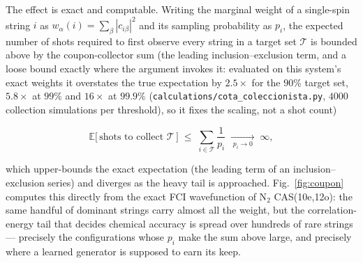\documentclass[onecolumn,a4paper]{quantumarticle}
\begin{document}
The effect is exact and computable. Writing the marginal weight of a single-spin string $i$ as $w_\alpha(i)=\sum_\beta|c_{i\beta}|^2$ and its sampling probability as $p_i$, the expected number of shots required to first observe every string in a target set $\mathcal T$ is bounded above by the coupon-collector sum (the leading inclusion--exclusion term, and a loose bound exactly where the argument invokes it: evaluated on this system's exact weights it overstates the true expectation by $2.5\times$ for the $90\%$ target set, $5.8\times$ at $99\%$ and $16\times$ at $99.9\%$ (\texttt{calculations/cota\_coleccionista.py}, $4000$ collection simulations per threshold), so it fixes the scaling, not a shot count)

\begin{equation}
\mathbb E\big[\,\text{shots to collect } \mathcal T\,\big] \;\le\; \sum_{i\in\mathcal T}\frac{1}{p_i} \;\xrightarrow[\;p_i\to 0\;]{}\; \infty,
\end{equation}

which upper-bounds the exact expectation (the leading term of an inclusion--exclusion series) and diverges as the heavy tail is approached. Fig.~\ref{fig:coupon} computes this directly from the exact FCI wavefunction of N$_2$ CAS(10e,12o): the same handful of dominant strings carry almost all the weight, but the correlation-energy tail that decides chemical accuracy is spread over hundreds of rare strings --- precisely the configurations whose $p_i$ make the sum above large, and precisely where a learned generator is supposed to earn its keep.
\end{document}
